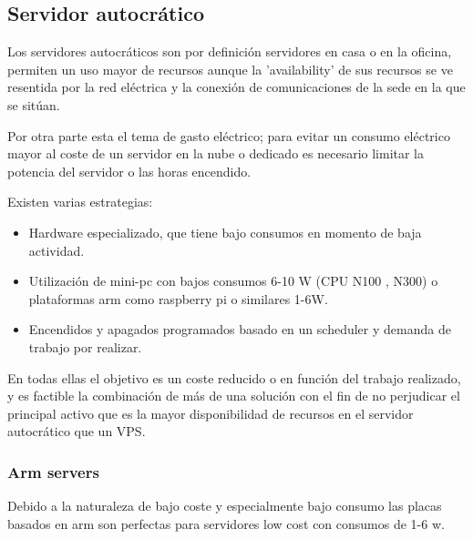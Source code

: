 \subsection{Servidor autocrático}
Los servidores autocráticos son por definición servidores en casa o en la oficina, permiten un uso mayor de recursos aunque la 'availability' de sus recursos se ve resentida por la red eléctrica y la conexión de comunicaciones de la sede en la que se sitúan.

Por otra parte esta el tema de gasto eléctrico; para evitar un consumo eléctrico mayor al coste de un servidor en la nube o dedicado es necesario limitar la potencia del servidor o las horas encendido.

Existen varias estrategias:
\begin{itemize}
    \item Hardware especializado, que tiene bajo consumos en momento de baja actividad.
    \item Utilización de mini-pc con bajos consumos 6-10 W (CPU N100 , N300) o plataformas arm como raspberry pi o similares 1-6W. 
    \item Encendidos y apagados programados basado en un scheduler y demanda de trabajo por realizar.
\end{itemize}

En todas ellas el objetivo es un coste reducido o en función del trabajo realizado, y es factible la combinación de más de una solución con el fin de no perjudicar el principal activo que es la mayor disponibilidad de recursos en el servidor autocrático que un VPS.

\subsubsection{Arm servers}
Debido a la naturaleza de bajo coste y especialmente bajo consumo las placas basados en arm son perfectas para servidores low cost con consumos de 1-6 w.

